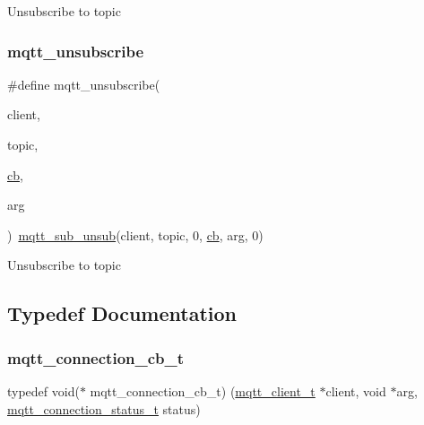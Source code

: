 Unsubscribe to topic \mbox{\label{group__mqtt_ga0f133ef09cbe56c46ebe2cc21afccf3f}} 
\subsubsection{\texorpdfstring{mqtt\+\_\+unsubscribe}{mqtt\_unsubscribe}\hspace{0.1cm}{\footnotesize\ttfamily [2/2]}}
{\footnotesize\ttfamily \#define mqtt\+\_\+unsubscribe(\begin{DoxyParamCaption}\item[{}]{client,  }\item[{}]{topic,  }\item[{}]{\hyperlink{periph__rtt_2main_8c_afd4145001d494db2ea612e1239724148}{cb},  }\item[{}]{arg }\end{DoxyParamCaption})~\hyperlink{openmote-cc2538_2lwip_2src_2include_2lwip_2apps_2mqtt_8h_afdb39d4a9758f98c02451aaa9a9b3103}{mqtt\+\_\+sub\+\_\+unsub}(client, topic, 0, \hyperlink{periph__rtt_2main_8c_afd4145001d494db2ea612e1239724148}{cb}, arg, 0)}

Unsubscribe to topic 

\subsection{Typedef Documentation}
\mbox{\label{group__mqtt_ga8558743bdb7d599a93844fbc56c9029f}} 
\subsubsection{\texorpdfstring{mqtt\+\_\+connection\+\_\+cb\+\_\+t}{mqtt\_connection\_cb\_t}\hspace{0.1cm}{\footnotesize\ttfamily [1/2]}}
{\footnotesize\ttfamily typedef void($\ast$ mqtt\+\_\+connection\+\_\+cb\+\_\+t) (\hyperlink{structmqtt__client__t}{mqtt\+\_\+client\+\_\+t} $\ast$client, void $\ast$arg, \hyperlink{group__mqtt_ga8cf0f360ab20343af37e1d124395a77d}{mqtt\+\_\+connection\+\_\+status\+\_\+t} status)}

